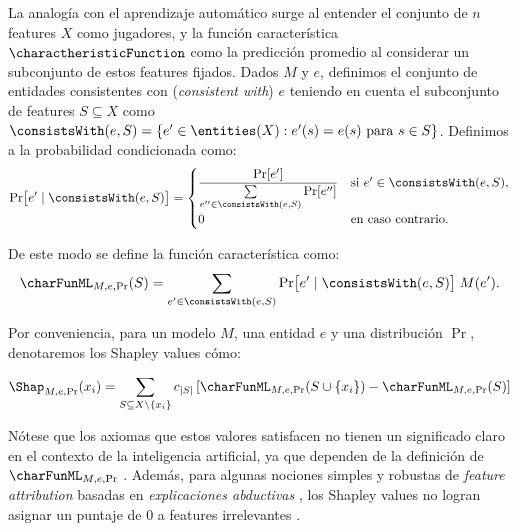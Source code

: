 La analogía con el aprendizaje automático surge al entender el conjunto de \(n\) features \(X\) como jugadores, y la función característica \(\charactheristicFunction\) como la predicción promedio al considerar un subconjunto de estos features fijados. Dados \(M\) y \(e\), definimos el conjunto de entidades consistentes con (\textit{consistent with}) \(e\) teniendo en cuenta el subconjunto de features \(S \subseteq X\) como \(\consistsWith(e, S) = \{e' \in \entities(X) : e'(s) = e(s) \text{ para } s \in S\}\). Definimos a la probabilidad condicionada como: %
\[
\Pr\bigl[e' \mid \consistsWith(e,S)\bigr] =
\begin{cases}
	\displaystyle \frac{\Pr[e']}{\sum\limits_{e'' \in \consistsWith(e,S)} \Pr[e'']} & \text{si } e' \in \consistsWith(e,S), \\
	0 & \text{en caso contrario}.
\end{cases}
\]


De este modo se define la función característica como:
\begin{align} \label{formula:characteristicFunctionDefinition}
	\charFunML_{M,e,\Pr}(S)
	= \sum_{e'\in\consistsWith(e,S)}
	\Pr\bigl[e'\mid\consistsWith(e,S)\bigr]\;M(e').    
\end{align}


Por conveniencia, para un modelo \(M\), una entidad \(e\) y una distribución \(\Pr\), denotaremos los Shapley values cómo:

\[
\Shap_{M,e,\Pr}(x_i) = \sum_{S \subseteq X \setminus \{x_i\}} c_{|S|} \left[ \charFunML_{M,e,\Pr}(S \cup \{x_i\}) - \charFunML_{M,e,\Pr}(S) \right]
\]



Nótese que los axiomas que estos valores satisfacen no tienen un significado claro en el contexto de la inteligencia artificial, ya que dependen de la definición de \(\charFunML_{M,e,\Pr}\) \cite{fryer2021shapley}. Además, para algunas nociones simples y robustas de \textit{feature attribution} basadas en \textit{explicaciones abductivas} \cite{marques2023logic}, los Shapley values no logran asignar un puntaje de 0 a features irrelevantes \cite{huang2023inadequacy}.

